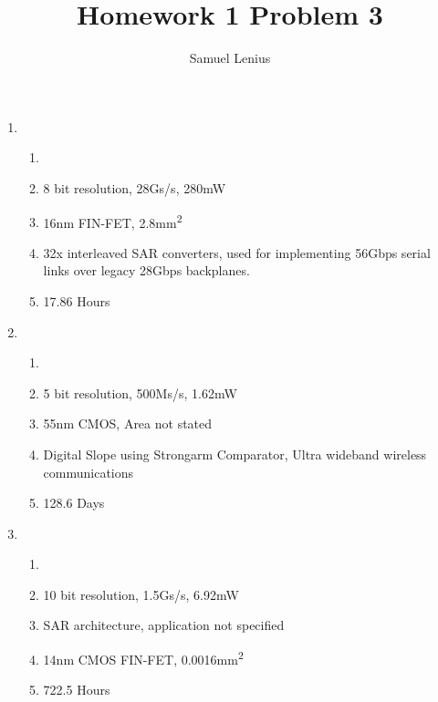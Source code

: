 \documentclass[conference]{IEEEtran}
\title{Homework 1 Problem 3}
\author{Samuel Lenius}
\begin{document}
\maketitle


\begin{enumerate}
  \item
    \begin{enumerate}[label=(\alph*)]
      \item \cite{7811205}
      \item 8 bit resolution, 28Gs/s, 280mW
      \item 16nm FIN-FET, 2.8mm\textsuperscript{2}
      \item 32x interleaved SAR converters, used for implementing 56Gbps serial links over legacy 28Gbps backplanes.
      \item 17.86 Hours
    \end{enumerate}
  \item
    \begin{enumerate}[label=(\alph*)]
      \item \cite{7904657}
      \item 5 bit resolution, 500Ms/s, 1.62mW
      \item 55nm CMOS, Area not stated
      \item Digital Slope using Strongarm Comparator, Ultra wideband wireless communications
      \item 128.6 Days
    \end{enumerate}
  \item
    \begin{enumerate}[label=(\alph*)]
      \item \cite{7870467}
      \item 10 bit resolution, 1.5Gs/s, 6.92mW
      \item SAR architecture, application not specified
      \item 14nm CMOS FIN-FET, 0.0016mm\textsuperscript{2}
      \item 722.5 Hours
    \end{enumerate}
\end{enumerate}


\end{document}
